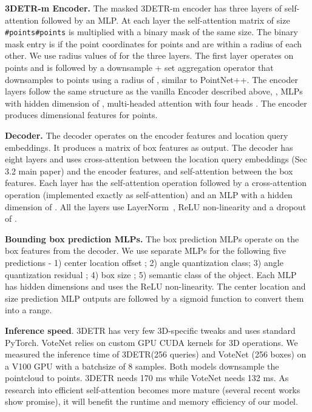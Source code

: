 \documentclass[10pt,twocolumn,letterpaper]{article}
\newcommand{\OURS}{3DETR\xspace}
\newcommand{\OURSm}{3DETR-m\xspace}
\begin{document}
\par \noindent \textbf{\OURSm Encoder.}
The masked \OURSm encoder has three layers of self-attention followed by an MLP.
At each layer the self-attention matrix of size \texttt{\#points}\texttt{\#points} is multiplied with a binary mask  of the same size.
The binary mask entry  is  if the point coordinates for points  and  are within a radius  of each other.
We use radius values of  for the three layers.
The first layer operates on  points and is followed by a downsample + set aggregation operator that downsamples to  points using a radius of , similar to PointNet++.
The encoder layers follow the same structure as the vanilla Encoder described above, \ie, MLPs with hidden dimension of , multi-headed attention with four heads \etc.
The encoder produces  dimensional features for  points.

\par \noindent \textbf{Decoder.}
The decoder operates on the  encoder features and  location query embeddings.
It produces a  matrix of box features as output.
The decoder has eight layers and uses cross-attention between the location query embeddings (Sec 3.2 main paper) and the encoder features, and self-attention between the box features.
Each layer has the self-attention operation followed by a cross-attention operation (implemented exactly as self-attention) and an MLP with a hidden dimension of .
All the layers use LayerNorm~\cite{ba2016layer}, ReLU non-linearity and a dropout of .


\par \noindent \textbf{Bounding box prediction MLPs.}
The box prediction MLPs operate on the  box features from the decoder.
We use separate MLPs for the following five predictions - 1) center location offset ; 2) angle quantization class; 3) angle quantization residual ; 4) box size ; 5) semantic class of the object.
Each MLP has  hidden dimensions and uses the ReLU non-linearity.
The center location and size prediction MLP outputs are followed by a sigmoid function to convert them into a  range.


\par \noindent \textbf{Inference speed}.
\OURS has very few 3D-specific tweaks and uses standard PyTorch.
VoteNet relies on custom GPU CUDA kernels for 3D operations.
We measured the inference time of \OURS (256 queries) and VoteNet (256 boxes) on a V100 GPU with a batchsize of 8 samples.
Both models downsample the pointcloud to  points.
\OURS needs 170 ms while VoteNet needs 132 ms.
As research into efficient self-attention becomes more mature (several recent works show promise), it will benefit the runtime and memory efficiency of our model.
\end{document}
